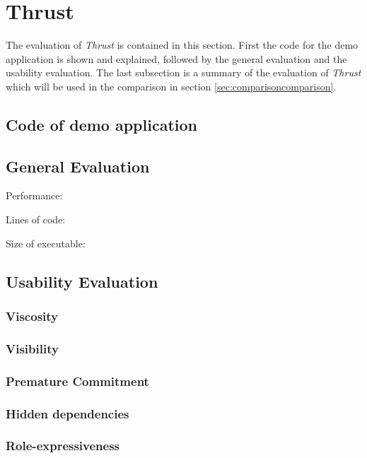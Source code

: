 \section{Thrust}
The evaluation of \textit{Thrust} is contained in this section. First the code for the demo application is shown and explained, followed by the general evaluation and the usability evaluation. The last subsection is a summary of the evaluation of \textit{Thrust} which will be used in the comparison in section \ref{sec:comparisoncomparison}.

\subsection{Code of demo application}

\subsection{General Evaluation}

Performance: 

Lines of code: 

Size of executable: 

\subsection{Usability Evaluation}

\subsubsection[*]{Viscosity}

\subsubsection[*]{Visibility}

\subsubsection[*]{Premature Commitment}

\subsubsection[*]{Hidden dependencies}

\subsubsection[*]{Role-expressiveness}

